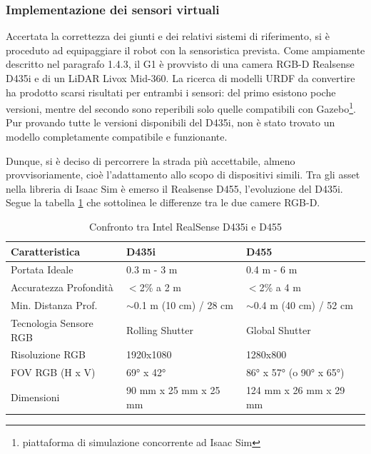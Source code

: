 \subsubsection{Implementazione dei sensori virtuali}
Accertata la correttezza dei giunti e dei relativi sistemi di riferimento, si è proceduto ad equipaggiare il robot con la sensoristica prevista. Come ampiamente descritto nel paragrafo 1.4.3, il G1 è provvisto di una camera RGB-D Realsense D435i e di un LiDAR Livox Mid-360. La ricerca di modelli URDF da convertire ha prodotto scarsi risultati per entrambi i sensori: del primo esistono poche versioni, mentre del secondo sono reperibili solo quelle compatibili con Gazebo\footnote{piattaforma di simulazione concorrente ad Isaac Sim}. Pur provando tutte le versioni disponibili del D435i, non è stato trovato un modello completamente compatibile e funzionante. 

Dunque, si è deciso di percorrere la strada più accettabile, almeno provvisoriamente, cioè l'adattamento allo scopo di dispositivi simili. Tra gli asset nella libreria di Isaac Sim è emerso il Realsense D455, l'evoluzione del D435i. Segue la tabella \ref{tab:realsense_comparison} che sottolinea le differenze tra le due camere RGB-D.

\begin{table}[h]
    \centering
    \begin{tabular}{|l|l|l|}
    \hline
    \textbf{Caratteristica}                 & \textbf{D435i} & \textbf{D455} \\   \hline
    Portata Ideale                           & 0.3 m - 3 m                   & 0.4 m - 6 m                  \\ \hline
    Accuratezza Profondità                   & $<$2\% a 2 m                    & $<$2\% a 4 m                   \\ \hline
    Min. Distanza Prof.                      & $\sim$0.1 m (10 cm) / 28 cm & $\sim$0.4 m (40 cm) / 52 cm \\ 
    \hline
    Tecnologia Sensore RGB                   & Rolling Shutter               & Global Shutter               \\ \hline
    Risoluzione RGB                          & 1920x1080                     & 1280x800                     \\  \hline
    FOV RGB (H x V)                          & 69° x 42°                     & 86° x 57° (o 90° x 65°)      \\   \hline
    Dimensioni                               & 90 mm x 25 mm x 25 mm         & 124 mm x 26 mm x 29 mm       \\ \hline
    \end{tabular}
    \caption{Confronto tra Intel RealSense D435i e D455}
    \label{tab:realsense_comparison}
\end{table}

